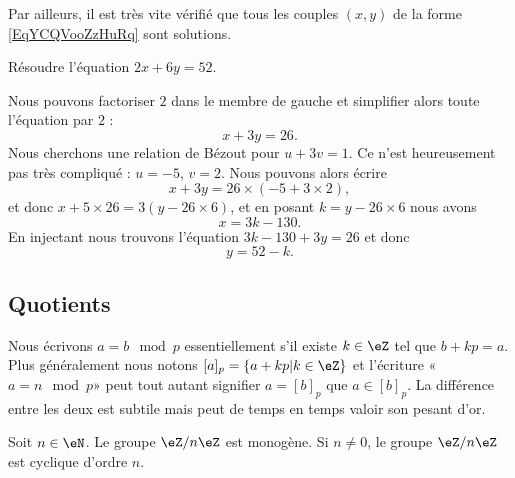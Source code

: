 Par ailleurs, il est très vite vérifié que tous les couples \( (x,y)\) de la forme \eqref{EqYCQVooZzHuRq} sont solutions.

\begin{example}
    Résoudre l'équation \( 2x+6y=52\).

    Nous pouvons factoriser \( 2\) dans le membre de gauche et simplifier alors toute l'équation par \( 2\) :
    \begin{equation}
        x+3y=26.
    \end{equation}
    Nous cherchons une relation de Bézout pour \( u+3v=1\). Ce n'est heureusement pas très compliqué : \( u=-5\), \( v=2\). Nous pouvons alors écrire
    \begin{equation}
        x+3y=26\times (-5+3\times 2),
    \end{equation}
    et donc \( x+5\times 26=3(y-26\times 6)\), et en posant \( k=y-26\times 6\) nous avons
    \begin{equation}
        x=3k-130.
    \end{equation}
    En injectant nous trouvons l'équation \( 3k-130+3y=26\) et donc
    \begin{equation}
        y=52-k.
    \end{equation}
\end{example}

\subsection{Quotients}

Nous écrivons \( a=b\mod p\) essentiellement s'il existe \( k\in \eZ\) tel que \( b+kp=a\). Plus généralement nous notons \( [a]_p=\{ a+kp|k\in \eZ \}\) et l'écriture «\( a=n\mod p\)» peut tout autant signifier \( a=[b]_p\) que \( a\in [b]_p\). La différence entre les deux est subtile mais peut de temps en temps valoir son pesant d'or.

\begin{proposition}
    Soit \( n\in\eN\). Le groupe \( \eZ/n\eZ\) est monogène. Si \( n\neq 0\), le groupe \( \eZ/n\eZ\) est cyclique d'ordre \( n\).
\end{proposition}

